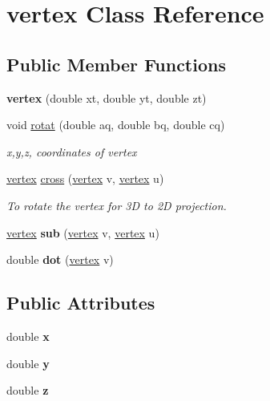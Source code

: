 \hypertarget{classvertex}{}\section{vertex Class Reference}
\label{classvertex}
\subsection*{Public Member Functions}
\begin{DoxyCompactItemize}
\item 
\mbox{\label{classvertex_a18c95e32e1c967b475f39bca2d88073a}} 
{\bfseries vertex} (double xt, double yt, double zt)
\item 
void \mbox{\hyperlink{classvertex_aeee1d0d1d69a140a20e7dd2cd214e616}{rotat}} (double aq, double bq, double cq)
\begin{DoxyCompactList}\small\item\em x,y,z, coordinates of vertex \end{DoxyCompactList}\item 
\mbox{\label{classvertex_a72d3b3e034943fb1b1caf1c9ea65a69c}} 
\mbox{\hyperlink{classvertex}{vertex}} \mbox{\hyperlink{classvertex_a72d3b3e034943fb1b1caf1c9ea65a69c}{cross}} (\mbox{\hyperlink{classvertex}{vertex}} v, \mbox{\hyperlink{classvertex}{vertex}} u)
\begin{DoxyCompactList}\small\item\em To rotate the vertex for 3D to 2D projection. \end{DoxyCompactList}\item 
\mbox{\label{classvertex_a9f7b2faefd6156a5d6ebc3115d391433}} 
\mbox{\hyperlink{classvertex}{vertex}} {\bfseries sub} (\mbox{\hyperlink{classvertex}{vertex}} v, \mbox{\hyperlink{classvertex}{vertex}} u)
\item 
\mbox{\label{classvertex_a5dd8e0928fa7be4dde8701b549769aa8}} 
double {\bfseries dot} (\mbox{\hyperlink{classvertex}{vertex}} v)
\end{DoxyCompactItemize}
\subsection*{Public Attributes}
\begin{DoxyCompactItemize}
\item 
\mbox{\label{classvertex_a11f52ec2e920d56500baefe5a2e2bba7}} 
double {\bfseries x}
\item 
\mbox{\label{classvertex_a8b9f211498390a67c369fd43f3722a19}} 
double {\bfseries y}
\item 
\mbox{\label{classvertex_a4e4f9696a91e9bee75a4c15d8d77e064}} 
double {\bfseries z}
\end{DoxyCompactItemize}


